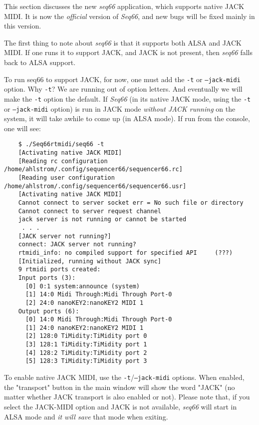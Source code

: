    This section discusses the new \textsl{seq66} application, which supports
   native JACK MIDI.  It is now the \textsl{official} version of
   \textsl{Seq66}, and new bugs will be fixed mainly in this version.

   The first thing to note about \textsl{seq66}
   is that it supports both ALSA and JACK
   MIDI.  If one runs it to support JACK, and JACK is not present, then
   \textsl{seq66}
   falls back to ALSA support.

   To run seq66 to support JACK, for now, one must add the
   \texttt{-t} or \texttt{--jack-midi}
   option.  Why \texttt{-t}?  We are running out of option letters.
   And eventually we will make the \texttt{-t} option the default.
   If \textsl{Seq66} (in its native JACK mode, using the
   \texttt{-t} or \texttt{--jack-midi} option)
   is run in JACK mode \textsl{without JACK running} on
   the system, it will take awhile to come up (in ALSA mode).  If run from the
   console, one will see:

\begin{verbatim}
	$ ./Seq66rtmidi/seq66 -t
	[Activating native JACK MIDI]
	[Reading rc configuration /home/ahlstrom/.config/sequencer66/sequencer66.rc]
	[Reading user configuration /home/ahlstrom/.config/sequencer66/sequencer66.usr]
	[Activating native JACK MIDI]
	Cannot connect to server socket err = No such file or directory
	Cannot connect to server request channel
	jack server is not running or cannot be started
     . . .
	[JACK server not running?]
	connect: JACK server not running?
	rtmidi_info: no compiled support for specified API     (???)
	[Initialized, running without JACK sync]
	9 rtmidi ports created:
	Input ports (3):
	  [0] 0:1 system:announce (system)
	  [1] 14:0 Midi Through:Midi Through Port-0
	  [2] 24:0 nanoKEY2:nanoKEY2 MIDI 1
	Output ports (6):
	  [0] 14:0 Midi Through:Midi Through Port-0 
	  [1] 24:0 nanoKEY2:nanoKEY2 MIDI 1 
	  [2] 128:0 TiMidity:TiMidity port 0 
	  [3] 128:1 TiMidity:TiMidity port 1 
	  [4] 128:2 TiMidity:TiMidity port 2 
	  [5] 128:3 TiMidity:TiMidity port 3 
\end{verbatim}

   To enable native JACK MIDI, use the
   \texttt{-t}/\texttt{--jack-midi} options.
   When enabled, the "transport" button in the main window will show the word
   "JACK" (no matter whether JACK transport is also enabled or not).
   Please note that, if you
   select the JACK-MIDI option and JACK is not available,
   \textsl{seq66} will start in
   ALSA mode and \textsl{it will save} that mode when exiting.

